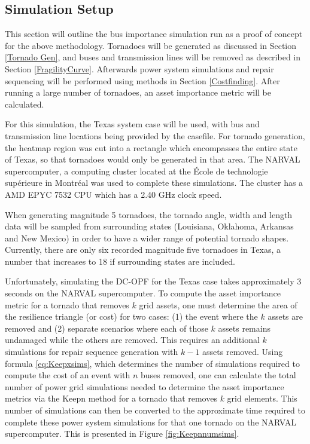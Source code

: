 \documentclass[12pt]{article}
\begin{document}
\subsection{Simulation Setup}
This section will outline the bus importance simulation run as a proof of concept for the above methodology. Tornadoes will be generated as discussed in Section \ref{Tornado Gen}, and buses and transmission lines will be removed as described in Section \ref{FragilityCurve}. Afterwards power system simulations and repair sequencing will be performed using methods in Section \ref{Costfinding}. After running a large number of tornadoes, an asset importance metric will be calculated. \par
For this simulation, the Texas system case will be used, with bus and transmission line locations being provided by the casefile. For tornado generation, the heatmap region was cut into a rectangle which encompasses the entire state of Texas, so that tornadoes would only be generated in that area. The NARVAL supercomputer, a computing cluster located at the École de technologie supérieure in Montréal \cite{NARVAL} was used to complete these simulations. The cluster has a AMD EPYC 7532 CPU which has a 2.40 GHz clock speed. \par
When generating magnitude 5 tornadoes, the tornado angle, width and length data will be sampled from surrounding states (Louisiana, Oklahoma, Arkansas and New Mexico) in order to have a wider range of potential tornado shapes. Currently, there are only six recorded magnitude five tornadoes in Texas, a number that increases to 18 if surrounding states are included. \par
Unfortunately, simulating the DC-OPF for the Texas case takes approximately 3 seconds on the NARVAL supercomputer. To compute the asset importance metric for a tornado that removes $k$ grid assets, one must determine the area of the resilience triangle (or cost) for two cases: (1) the event where the $k$ assets are removed and (2) separate scenarios where each of those $k$ assets remains undamaged while the others are removed. This requires an additional $k$ simulations for repair sequence generation with $k-1$ assets removed. Using formula \ref{eq:Keepxsims}, which determines the number of simulations required to compute the cost of an event with $n$ buses removed, one can calculate the total number of power grid simulations needed to determine the asset importance metrics via the Keepn method for a tornado that removes $k$ grid elements. This number of simulations can then be converted to the approximate time required to complete these power system simulations for that one tornado on the NARVAL supercomputer. This is presented in Figure \ref{fig:Keepnnumsims}. \par
\end{document}
